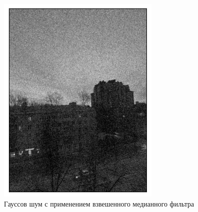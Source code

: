 \documentclass[a4paper,12pt]{article}
\begin{document}
\begin{figure}[H]
    \begin{minipage}{0.49\textwidth}
        \centering \includegraphics[width=\textwidth]{results/nlf_gaus_2.png}
        \caption{Гауссов шум с применением взвешенного медианного фильтра}
    \end{minipage}\hfill
    \begin{minipage}{0.49\textwidth}

\end{minipage}
\end{figure}
\end{document}
